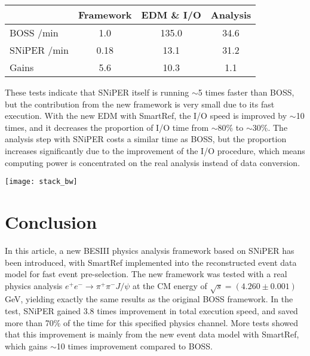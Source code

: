 \documentclass[a4paper,10pt,twoside]{cpc-hepnp}
\begin{document}
\begin{CJK*}{GB}{gbsn}
\begin{multicols}{2}
\begin{center}
\footnotesize
\begin{tabular*}{77mm}{lccc}
\toprule
            & Framework & EDM \& I/O &  Analysis   \\ \midrule      
BOSS /min   &  1.0      & 135.0      &  34.6       \\            
SNiPER /min &  0.18     & 13.1       &  31.2       \\ \midrule   
Gains       &  5.6      & 10.3       &  1.1        \\ \bottomrule
\end{tabular*}
\vspace{0mm}
\end{center}

These tests indicate that SNiPER itself is running $\sim$5 times faster than BOSS, but the contribution from the new framework is very small due to its fast execution.
With the new EDM with SmartRef, the I/O speed is improved by $\sim$10 times, and it decreases the proportion of I/O time from $\sim$80\% to $\sim$30\%.
The analysis step with SNiPER costs a similar time as BOSS, but the proportion increases significantly due to the improvement of the I/O procedure, which means computing power is concentrated on the real analysis instead of data conversion.

\begin{center}
\texttt{[image: stack\_bw]}
\end{center}


\section{Conclusion}

In this article, a new BESIII physics analysis framework based on SNiPER has been introduced, with SmartRef implemented into the reconstructed event data model for fast event pre-selection.
The new framework was tested with a real physics analysis $e^{+}e^{-} \rightarrow \pi^{+}\pi^{-}J/\psi$ at the CM energy of $\sqrt{s} = (4.260\pm0.001)$\,GeV, yielding exactly the same results as the original BOSS framework.
In the test, SNiPER gained 3.8 times improvement in total execution speed, and saved more than 70\% of the time for this specified physics channel.
More tests showed that this improvement is mainly from the new event data model with SmartRef, which gains $\sim$10 times improvement compared to BOSS.


\end{multicols}
\end{CJK*}
\end{document}

